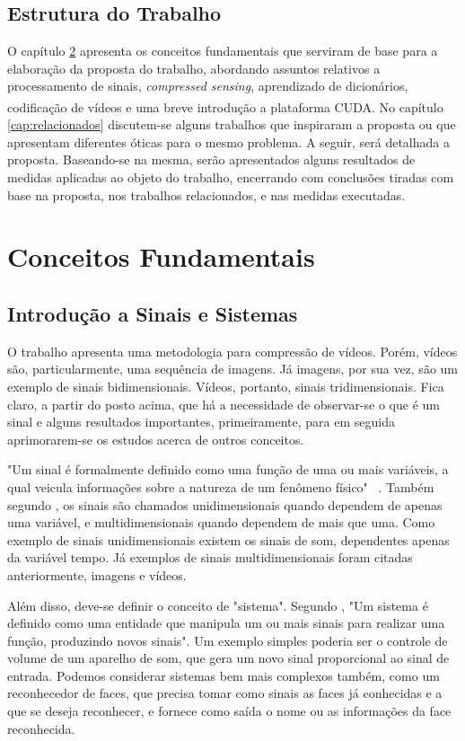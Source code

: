 \documentclass[cic,tc]{iiufrgs}
\newcommand{\reg}{\textsuperscript{\textregistered}}
\begin{document}
\section{Estrutura do Trabalho}
O capítulo \ref{cap:ref} apresenta os conceitos fundamentais que serviram de base
para a elaboração da proposta do trabalho,
abordando assuntos relativos a processamento de sinais, \emph{compressed sensing}, 
aprendizado de dicionários, codificação de vídeos e uma breve introdução 
a plataforma CUDA\reg.
No capítulo \ref{cap:relacionados} discutem-se alguns trabalhos que inspiraram a 
proposta ou que apresentam diferentes óticas para o mesmo problema.
A seguir, será detalhada a proposta. 
Baseando-se na mesma, serão apresentados alguns resultados de medidas 
aplicadas ao objeto do trabalho, encerrando com conclusões tiradas com 
base na proposta, nos trabalhos relacionados, e nas medidas executadas.

\chapter{Conceitos Fundamentais}
\label{cap:ref}

\section{Introdução a Sinais e Sistemas}
O trabalho apresenta uma metodologia para compressão de vídeos.
Porém, vídeos são, particularmente, uma sequência de imagens.
Já imagens, por sua vez, são um exemplo de sinais bidimensionais.
Vídeos, portanto, sinais tridimensionais.
Fica claro, a partir do posto acima, que há a necessidade de observar-se 
o que é um sinal e alguns resultados importantes, primeiramente, para 
em seguida aprimorarem-se os estudos acerca de outros conceitos.

"Um sinal é formalmente definido como uma função de uma ou mais variáveis, 
a qual veicula informações sobre a natureza de um fenômeno físico"~ \cite{haykin2001sinais}.
Também segundo \citet{haykin2001sinais}, os sinais são chamados unidimensionais quando
dependem de apenas uma variável, e multidimensionais quando dependem de mais que uma.
Como exemplo de sinais unidimensionais existem os sinais de som, dependentes apenas da variável tempo.
Já exemplos de sinais multidimensionais foram citadas anteriormente, imagens e vídeos. 

Além disso, deve-se definir o conceito de "sistema". 
Segundo \citet{haykin2001sinais}, "Um sistema é definido como uma entidade que manipula
um ou mais sinais para realizar uma função, produzindo novos sinais".
Um exemplo simples poderia ser o controle de volume de um aparelho de som,
que gera um novo sinal proporcional ao sinal de entrada.
Podemos considerar sistemas bem mais complexos também, como um reconhecedor 
de faces, que precisa tomar como sinais as faces já conhecidas e a que se 
deseja reconhecer, e fornece como saída o nome ou as informações da face reconhecida.
\end{document}
